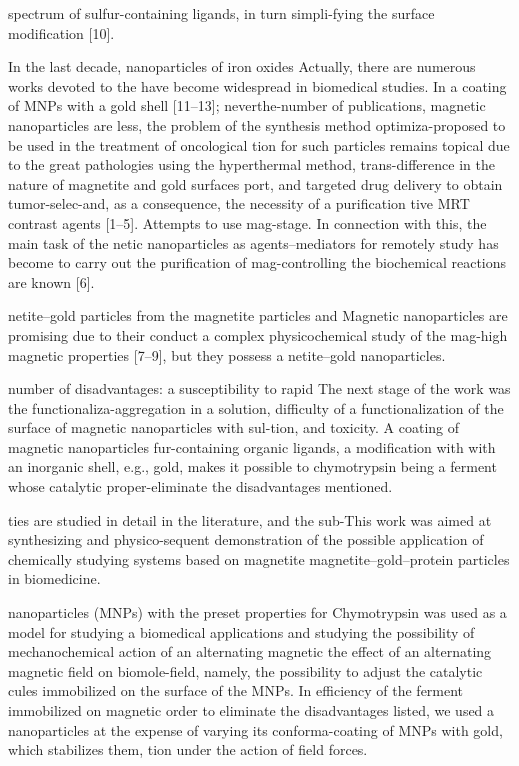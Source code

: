 \documentclass[12pt,a4paper]{article}
\begin{document}
spectrum of sulfur-containing ligands, in turn simpli-fying the surface
modification {[}10{]}.

In the last decade, nanoparticles of iron oxides Actually, there are
numerous works devoted to the have become widespread in biomedical
studies. In a coating of MNPs with a gold shell {[}11--13{]};
neverthe-number of publications, magnetic nanoparticles are less, the
problem of the synthesis method optimiza-proposed to be used in the
treatment of oncological tion for such particles remains topical due to
the great pathologies using the hyperthermal method, trans-difference in
the nature of magnetite and gold surfaces port, and targeted drug
delivery to obtain tumor-selec-and, as a consequence, the necessity of a
purification tive MRT contrast agents {[}1--5{]}. Attempts to use
mag-stage. In connection with this, the main task of the netic
nanoparticles as agents--mediators for remotely study has become to
carry out the purification of mag-controlling the biochemical reactions
are known {[}6{]}.

netite--gold particles from the magnetite particles and Magnetic
nanoparticles are promising due to their conduct a complex
physicochemical study of the mag-high magnetic properties {[}7--9{]},
but they possess a netite--gold nanoparticles.

number of disadvantages: a susceptibility to rapid The next stage of the
work was the functionaliza-aggregation in a solution, difficulty of a
functionalization of the surface of magnetic nanoparticles with
sul-tion, and toxicity. A coating of magnetic nanoparticles
fur-containing organic ligands, a modification with with an inorganic
shell, e.g., gold, makes it possible to chymotrypsin being a ferment
whose catalytic proper-eliminate the disadvantages mentioned.

ties are studied in detail in the literature, and the sub-This work was
aimed at synthesizing and physico-sequent demonstration of the possible
application of chemically studying systems based on magnetite
magnetite--gold--protein particles in biomedicine.

nanoparticles (MNPs) with the preset properties for Chymotrypsin was
used as a model for studying a biomedical applications and studying the
possibility of mechanochemical action of an alternating magnetic the
effect of an alternating magnetic field on biomole-field, namely, the
possibility to adjust the catalytic cules immobilized on the surface of
the MNPs. In efficiency of the ferment immobilized on magnetic order to
eliminate the disadvantages listed, we used a nanoparticles at the
expense of varying its conforma-coating of MNPs with gold, which
stabilizes them, tion under the action of field forces.
\end{document}
